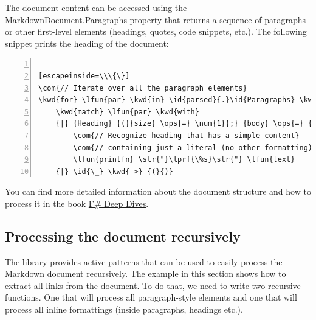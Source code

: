 \documentclass{article}
\newcommand{\id}[1]{\textcolor{black}{#1}}
\newcommand{\com}[1]{\textcolor{officegreen}{#1}}
\newcommand{\kwd}[1]{\textcolor{navy}{#1}}
\newcommand{\num}[1]{\textcolor{officegreen}{#1}}
\newcommand{\ops}[1]{\textcolor{purple}{#1}}
\newcommand{\str}[1]{\textcolor{olive}{#1}}
\begin{document}
The document content can be accessed using the \href{https://fsprojects.github.io/FSharp.Formatting/reference/fsharp-formatting-markdown-markdowndocument.html\#Paragraphs}{MarkdownDocument.Paragraphs} property that returns
a sequence of paragraphs or other first-level elements (headings, quotes, code snippets, etc.).
The following snippet prints the heading of the document:
\begin{lstlisting}[numbers=left]

[escapeinside=\\\{\}]
\com{// Iterate over all the paragraph elements}
\kwd{for} \lfun{par} \kwd{in} \id{parsed}{.}\id{Paragraphs} \kwd{do}
    \kwd{match} \lfun{par} \kwd{with}
    {|} {Heading} {(}{size} \ops{=} \num{1}{;} {body} \ops{=} {[} {Literal} {(}{text} \ops{=} \lfun{text}{)} {]}{)} \kwd{->}
        \com{// Recognize heading that has a simple content}
        \com{// containing just a literal (no other formatting)}
        \lfun{printfn} \str{"}\lprf{\%s}\str{"} \lfun{text}
    {|} \id{\_} \kwd{->} {(}{)}

\end{lstlisting}



You can find more detailed information about the document structure and how to process it
in the book \href{http://manning.com/petricek2/}{F\# Deep Dives}.
\subsection*{Processing the document recursively}



The library provides active patterns that can be used to easily process the Markdown
document recursively. The example in this section shows how to extract all links from the
document. To do that, we need to write two recursive functions. One that will process
all paragraph-style elements and one that will process all inline formattings (inside
paragraphs, headings etc.).
\end{document}
